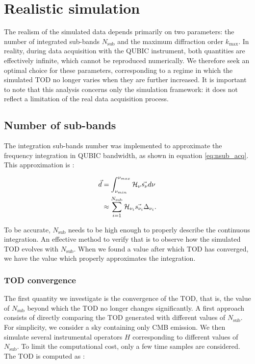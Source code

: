 \documentclass[../../thesis.tex]{subfiles}
\begin{document}
\section{Realistic simulation}

The realism of the simulated data depends primarily on two parameters: the number of integrated sub-bands $N_{\text{sub}}$ and the maximum diffraction order $k_{\text{max}}$. In reality, during data acquisition with the QUBIC instrument, both quantities are effectively infinite, which cannot be reproduced numerically. We therefore seek an optimal choice for these parameters, corresponding to a regime in which the simulated TOD no longer varies when they are further increased.
It is important to note that this analysis concerns only the simulation framework: it does not reflect a limitation of the real data acquisition process.

\subsection{Number of sub-bands} \label{sub:nsub}

The integration sub-bands number was implemented to approximate the frequency integration in QUBIC bandwidth, as shown in equation \ref{eq:nsub_acq}. This approximation is : 

\begin{align} 
    \vec{d} &= \int_{\nu_{min}}^{\nu_{max}}\mathcal{H}_\nu\vec{s_\nu}d\nu \notag \\
    & \approx \sum_{i = 1}^{N_\text{sub}} \mathcal{H}_{\nu_i} \vec{s_{\nu_i}}\Delta_{\nu_i}.
\end{align}

To be accurate, $N_\text{sub}$ needs to be high enough to properly describe the continuous integration. An effective method to verify that is to observe how the simulated TOD evolves with $N_\text{sub}$. When we found a value after which TOD has converged, we have the value which properly approximates the integration. 

\subsubsection{TOD convergence}

The first quantity we investigate is the convergence of the TOD, that is, the value of $N_{\text{sub}}$ beyond which the TOD no longer changes significantly. A first approach consists of directly comparing the TOD generated with different values of $N_{\text{sub}}$. For simplicity, we consider a sky containing only CMB emission. We then simulate several instrumental operators $H$ corresponding to different values of $N_{\text{sub}}$. To limit the computational cost, only a few time samples are considered. The TOD is computed as :
\end{document}
